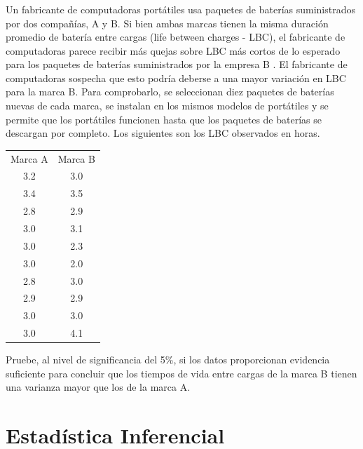 \documentclass[11pt,letterpaper]{report}
\begin{document}
       \subsection{}%
         Un fabricante de computadoras portátiles usa paquetes de baterías suministrados por dos compañías, A y B. Si bien ambas marcas tienen la misma duración promedio de batería entre cargas (life between charges - LBC), el fabricante de computadoras parece recibir más quejas sobre LBC más cortos de lo esperado para los paquetes de baterías suministrados por la empresa B . El fabricante de computadoras sospecha que esto podría deberse a una mayor variación en LBC para la marca B. Para comprobarlo, se seleccionan diez paquetes de baterías nuevas de cada marca, se instalan en los mismos modelos de portátiles y se permite que los portátiles funcionen hasta que los paquetes de baterías se descargan por completo. Los siguientes son los LBC observados en horas.
         \begin{table}[!ht]
             \begin{tabular}{cc}
                 Marca A & Marca B \\
                 3.2  &	3.0 \\
                 3.4&	3.5 \\
                 2.8&	2.9 \\
                 3.0&	3.1 \\
                 3.0&	2.3 \\
                 3.0&	2.0 \\
                 2.8&	3.0 \\
                 2.9&	2.9 \\
                 3.0&	3.0 \\
                 3.0&	4.1
             \end{tabular}
         \end{table}
        Pruebe, al nivel de significancia del 5\%, si los datos proporcionan evidencia suficiente para concluir que los tiempos de vida entre cargas de la marca B tienen una varianza mayor que los de la marca A.


  \chapter{Estad\'istica Inferencial}
\end{document}
